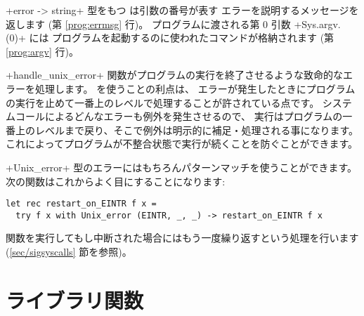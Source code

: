 \ml+error -> string+ 型をもつ  は引数の番号が表す
エラーを説明するメッセージを返します (第 \ref{prog:errmsg} 行)。
プログラムに渡される第 0 引数 \ml+Sys.argv.(0)+ には
プログラムを起動するのに使われたコマンドが格納されます (第 \ref{prog:argv} 行)。

\ml+handle_unix_error+ 関数がプログラムの実行を終了させるような致命的なエラーを処理します。
\ocaml を使うことの利点は、 エラーが発生したときにプログラムの実行を止めて一番上のレベルで処理することが許されている点です。
システムコールによるどんなエラーも例外を発生させるので、
実行はプログラムの一番上のレベルまで戻り、そこで例外は明示的に補足・処理される事になります。
これによってプログラムが不整合状態で実行が続くことを防ぐことができます。

\ml+Unix_error+ 型のエラーにはもちろんパターンマッチを使うことができます。
次の関数はこれからよく目にすることになります:
%
\begin{lstlisting}
let rec restart_on_EINTR f x =
  try f x with Unix_error (EINTR, _, _) -> restart_on_EINTR f x
\end{lstlisting}
%
関数を実行してもし中断された場合にはもう一度繰り返すという処理を行います (\ref{sec/sigsyscalls} 節を参照)。

\section{ライブラリ関数}

